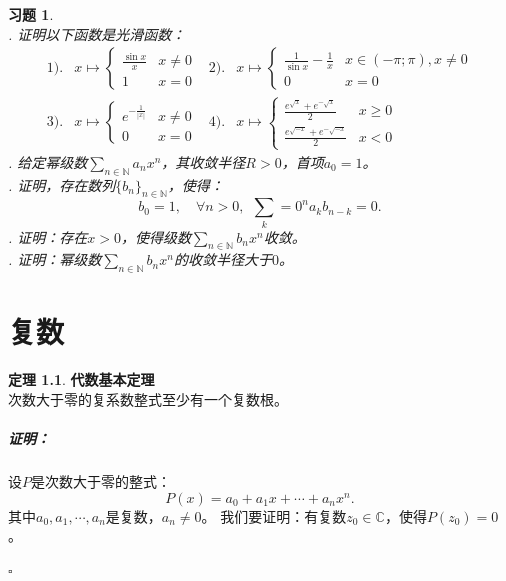 \documentclass[12pt,UTF8]{ctexbook}
\theoremstyle{definition}
\newtheorem{tm}{定理}[section]
\theoremstyle{plain}
\newtheorem{xt}{习题}[section]
\renewenvironment{proof}{\paragraph{\textbf{证明：}}}{\hfill$\square$}
\begin{document}
\begin{appendix}
\begin{xt}
    \mbox{} \\
    . 证明以下函数是光滑函数：
    \begin{align*}
        1).& 
        x \mapsto \begin{cases}
            \frac{\sin{x}}{x} & x\neq 0 \\
            1 & x = 0 
        \end{cases}
        &2).&
        x \mapsto \begin{cases}
            \frac{1}{\sin{x}} - \frac{1}{x} & x\in (-\pi;\pi), x\neq 0 \\
            0 & x = 0 
        \end{cases} \\
        3).& 
        x \mapsto \begin{cases}
            e^{-\frac{1}{|x|}} & x\neq 0 \\
            0 & x = 0 
        \end{cases}
        &4).&
        x \mapsto \begin{cases}
            \frac{e^{\sqrt{x}} + e^{-\sqrt{x}}}{2} & x\geqslant 0 \\
            \frac{e^{\sqrt{-x}} + e^{-\sqrt{-x}}}{2} & x < 0 
        \end{cases}
    \end{align*}
    . 给定幂级数$\sum_{n\in\mathbb{N}} a_n x^n$，其收敛半径$R>0$，首项$a_0=1$。\\
    . 证明，存在数列$\{b_n\}_{n\in\mathbb{N}}$，使得：
    $$
    b_0 = 1, \quad \forall n > 0, \;\, \sum_k=0^n a_k b_{n-k} = 0.
    $$
    . 证明：存在$x>0$，使得级数$\sum_{n\in\mathbb{N}} b_n x^n$收敛。\\
    . 证明：幂级数$\sum_{n\in\mathbb{N}} b_n x^n$的收敛半径大于$0$。
\end{xt}

\chapter{复数}

\begin{tm}{\textbf{代数基本定理}}
    \mbox{} \\
    次数大于零的复系数整式至少有一个复数根。
\end{tm}

\begin{proof}
    设$P$是次数大于零的整式：
    $$ P(x) = a_0 + a_1 x + \cdots + a_n x^n.$$
    其中$a_0, a_1, \cdots , a_n$是复数，$a_n \neq 0$。
    我们要证明：有复数$z_0\in\mathbb{C}$，使得$P(z_0) = 0$。


\end{proof}
\end{appendix}
\end{document}

